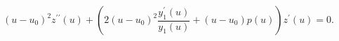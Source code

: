 \begin{equation}
\label{difeqz}
(u-u_0)^2 z^{\prime \prime}(u) + \left(
2 (u-u_0)^2 \frac{y_1^\prime(u)}{y_1(u)} + (u-u_0) p(u) 
\right) z^\prime(u) = 0.
\end{equation}

